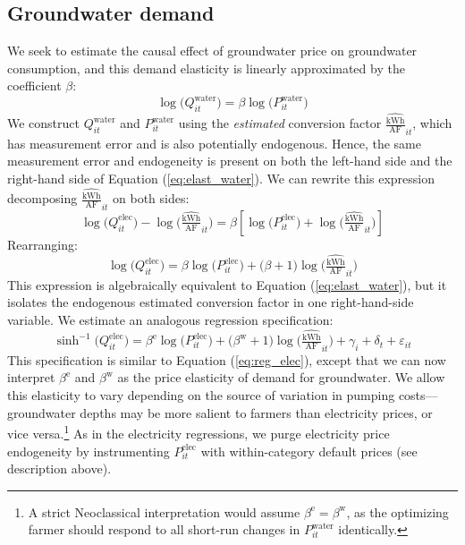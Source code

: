 \subsection{Groundwater demand}\label{sec:empirics_water}
We seek to estimate the causal effect of groundwater price on groundwater consumption, and this demand elasticity is linearly approximated by the coefficient $\beta$:
\begin{equation}
\log\big(Q^{\text{water}}_{it}\big) = \beta \log\big({P}^{\text{water}}_{it}\big) \label{eq:elast_water}
\end{equation}
We construct $Q^{\text{water}}_{it}$ and $P^{\text{water}}_{it}$ 
using the \emph{estimated} conversion factor $\widehat{\tfrac{{\text{kWh}}}{\text{AF}}}_{it}$, which has measurement error and is also potentially endogenous.
Hence, the same measurement error and endogeneity is present on both the left-hand side and the right-hand side of Equation (\ref{eq:elast_water}).
We can rewrite this expression decomposing $\widehat{\tfrac{{\text{kWh}}}{\text{AF}}}_{it}$ on both sides:
\begin{equation}
\log\big(Q^{\text{elec}}_{it}\big) - \log\Big(\widehat{\tfrac{{\text{kWh}}}{\text{AF}}}_{it}\Big) = \beta \left[\log\big(P_{it}^{\text{elec}}\big) + \log\Big(\widehat{\tfrac{{\text{kWh}}}{\text{AF}}}_{it}\Big) \right]
\end{equation}
Rearranging:
\begin{equation}
\log\big(Q^{\text{elec}}_{it}\big) = \beta\log\big({P}^{\text{elec}}_{it}\big) + \big(\beta+1\big)\log\Big(\widehat{\tfrac{{\text{kWh}}}{\text{AF}}}_{it}\Big) 
\end{equation}
This expression is algebraically equivalent to Equation (\ref{eq:elast_water}), but it isolates the endogenous estimated conversion factor in one right-hand-side variable. We estimate an analogous regression specification:
\begin{equation}
\sinh^{-1}\big(Q^{\text{elec}}_{it}\big) = \beta^{\text{e}}\log\big({P}^{\text{elec}}_{it}\big) + \big(\beta^{\text{w}}+1\big)\log\Big(\widehat{\tfrac{{\text{kWh}}}{\text{AF}}}_{it}\Big) + \gamma_{i} + \delta_t + \varepsilon_{it} \label{eq:reg_water} 
\end{equation}
This specification is similar to Equation (\ref{eq:reg_elec}), except that we can now interpret $\beta^{\text{e}}$ and $\beta^{\text{w}}$ as the price elasticity of demand for groundwater. We allow this elasticity to vary depending on the source of variation in pumping costs---groundwater depths may be more salient to farmers than electricity prices, or vice versa.\footnote{
A strict Neoclassical interpretation would assume $\beta^{\text{e}} = \beta^{\text{w}}$, as the optimizing farmer should respond to all short-run changes in ${P}^{\text{water}}_{it}$ identically.
}
As in the electricity regressions, we purge electricity price endogeneity by instrumenting $P^{\text{elec}}_{it}$ with within-category default prices (see description above).


